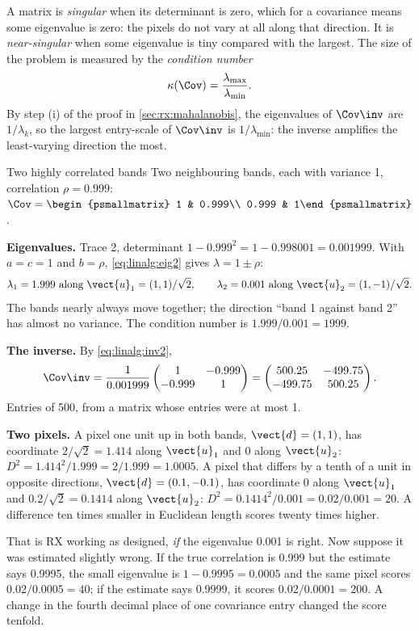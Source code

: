A matrix is \emph{singular} when its determinant is zero, which for a
covariance means some eigenvalue is zero: the pixels do not vary at all along that direction. It is
\emph{near-singular} when some eigenvalue is tiny compared with the largest. The size of the problem
is measured by the \emph{condition number}
\begin{equation}\label{eq:rx:kappa}
\kappa(\Cov) = \frac{\lambda_{\max}}{\lambda_{\min}} .
\end{equation}
By step (i) of the proof in \cref{sec:rx:mahalanobis}, the eigenvalues of $\Cov\inv$ are
$1/\lambda_k$, so the largest entry-scale of $\Cov\inv$ is $1/\lambda_{\min}$: the inverse amplifies
the least-varying direction the most.

\begin{worked}[label={we:rx:nearsingular}]{Two highly correlated bands}
Two neighbouring bands, each with variance 1, correlation $\rho = 0.999$:
$\Cov = \begin{psmallmatrix} 1 & 0.999\\ 0.999 & 1\end{psmallmatrix}$.

\textbf{Eigenvalues.} Trace 2, determinant $1 - 0.999^2 = 1 - 0.998001 = 0.001999$. With $a = c = 1$
and $b = \rho$, \cref{eq:linalg:eig2} gives $\lambda = 1 \pm \rho$:
\[
\lambda_1 = 1.999 \text{ along } \vect{u}_1 = (1, 1)/\sqrt2,\qquad
\lambda_2 = 0.001 \text{ along } \vect{u}_2 = (1, -1)/\sqrt2 .
\]
The bands nearly always move together; the direction ``band 1 against band 2'' has almost no
variance. The condition number is $1.999/0.001 = 1999$.

\textbf{The inverse.} By \cref{eq:linalg:inv2},
\[
\Cov\inv = \frac{1}{0.001999}\begin{pmatrix} 1 & -0.999\\ -0.999 & 1\end{pmatrix}
= \begin{pmatrix} 500.25 & -499.75\\ -499.75 & 500.25\end{pmatrix}.
\]
Entries of 500, from a matrix whose entries were at most 1.

\textbf{Two pixels.} A pixel one unit up in both bands, $\vect{d} = (1, 1)$, has coordinate
$2/\sqrt2 = 1.414$ along $\vect{u}_1$ and 0 along $\vect{u}_2$:
$D^2 = 1.414^2/1.999 = 2/1.999 = 1.0005$. A pixel that differs by a tenth of a unit in opposite
directions, $\vect{d} = (0.1, -0.1)$, has coordinate 0 along $\vect{u}_1$ and $0.2/\sqrt2 = 0.1414$
along $\vect{u}_2$: $D^2 = 0.1414^2/0.001 = 0.02/0.001 = 20$. A difference ten times smaller in
Euclidean length scores twenty times higher.

That is RX working as designed, \emph{if} the eigenvalue 0.001 is right. Now suppose it was
estimated slightly wrong. If the true correlation is 0.999 but the estimate says 0.9995, the small
eigenvalue is $1 - 0.9995 = 0.0005$ and the same pixel scores $0.02/0.0005 = 40$; if the estimate
says 0.9999, it scores $0.02/0.0001 = 200$. A change in the fourth decimal place of one covariance
entry changed the score tenfold.
\end{worked}

